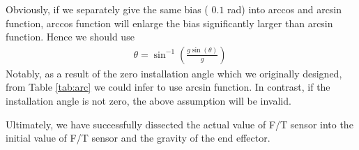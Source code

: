 Obviously, if we separately give the same bias ( $0.1$ rad) into arccos and arcsin function, arccos function will enlarge the bias significantly larger than arcsin function. Hence we should use
\begin{equation}
\begin{split}
\theta = \sin^{-1}\left(\frac{g\sin(\theta)}{g}\right)\
\end{split}
\end{equation}
Notably, as a result of the zero installation angle which we originally designed, from Table \ref{tab:arc} we could infer to use arcsin function. In contrast, if the installation angle is not zero, the above assumption will be invalid.
\par
Ultimately, we have successfully dissected the actual value of F/T sensor into the initial value of F/T sensor and the gravity of the end effector. 
